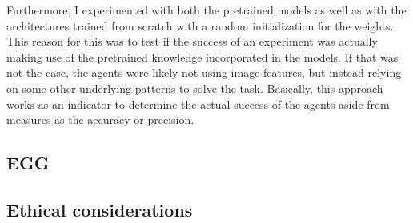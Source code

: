 Furthermore, I experimented with both the pretrained models as well as with the architectures trained from scratch with a random initialization for the weights.
This reason for this was to test if the success of an experiment was actually making use of the pretrained knowledge incorporated in the models.
If that was not the case, the agents were likely not using image features, but instead relying on some other underlying patterns to solve the task.
Basically, this approach works as an indicator to determine the actual success of the agents aside from measures as the accuracy or precision.


\subsection{EGG}

\subsection{Ethical considerations}